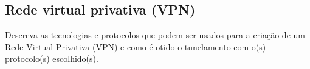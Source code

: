 \subsection*{Rede virtual privativa (VPN)}

\exercise Descreva as tecnologias e protocolos que podem ser usados
para a criação de um Rede Virtual Privativa (VPN) e como é otido o
tunelamento com o(s) protocolo(s) escolhido(s).